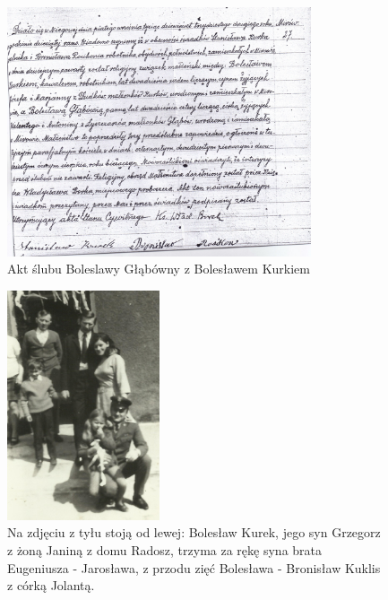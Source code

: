 \begin{figure}[!h]
\begin{center}
\includegraphics[width=0.8\textwidth]{zdjecia/akt_slubu_boleslawy_i_boleslawa_kurkow.jpg}
\caption{Akt ślubu Boleslawy Głąbówny z Bolesławem Kurkiem}
\label{rys:akt_slubu_boleslawy_i_boleslawa_kurkow}
\end{center}
\end{figure}

\begin{figure}[!h]
\begin{center}
\includegraphics[width=0.4\textwidth]{zdjecia/boleslaw_kurek_z_synem_i_zieciem.jpg}
\caption[Bolesław Kurek z synem, synową i zięciem]{Na zdjęciu z tyłu stoją od lewej: Bolesław Kurek, jego syn Grzegorz z żoną Janiną z domu Radosz, trzyma za rękę syna brata Eugeniusza - Jarosława, z przodu zięć Bolesława - Bronisław Kuklis z córką Jolantą.}
\label{rys:boleslaw_kurek_z_synem_i_zieciem}
\end{center}
\end{figure}

